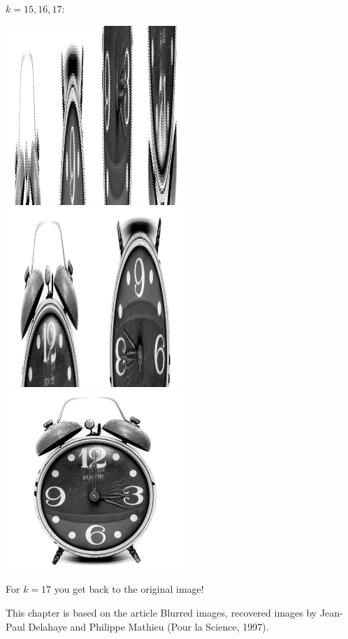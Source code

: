 \documentclass[11pt,class=report,crop=false]{standalone}
\begin{document}
\begin{activite}
$k=15,16,17$:
\begin{center}
\includegraphics[scale=\myscale,scale=0.4]{images_chapter/clock_gimp_new_baker_15.png}\qquad
\includegraphics[scale=\myscale,scale=0.4]{images_chapter/clock_gimp_new_baker_16.png}\qquad
\includegraphics[scale=\myscale,scale=0.4]{images_chapter/clock_gimp_new_baker_17.png}
\end{center}

For $k=17$ you get back to the original image!

\end{activite}


This chapter is based on the article \og{}Blurred images, recovered images\fg{} by Jean-Paul Delahaye and Philippe Mathieu (Pour la Science, 1997).
\end{document}
